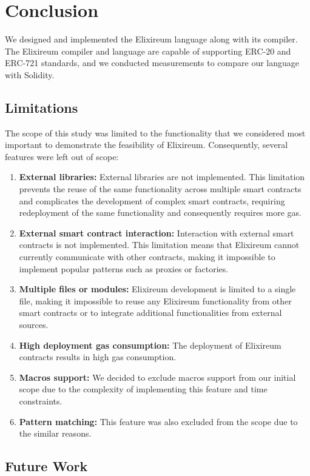 \chapter{Conclusion}
\label{chap:concl}

We designed and implemented the Elixireum language along with its compiler. The Elixireum compiler and language are capable of supporting ERC-20 and ERC-721 standards, and we conducted measurements to compare our language with Solidity.

\section{Limitations}

The scope of this study was limited to the functionality that we considered most important to demonstrate the feasibility of Elixireum. Consequently, several features were left out of scope:

\begin{enumerate}
\item \textbf{External libraries:} External libraries are not implemented. This limitation prevents the reuse of the same functionality across multiple smart contracts and complicates the development of complex smart contracts, requiring redeployment of the same functionality and consequently requires more gas.
\item \textbf{External smart contract interaction:} Interaction with external smart contracts is not implemented. This limitation means that Elixireum cannot currently communicate with other contracts, making it impossible to implement popular patterns such as proxies or factories.
\item \textbf{Multiple files or modules:} Elixireum development is limited to a single file, making it impossible to reuse any Elixireum functionality from other smart contracts or to integrate additional functionalities from external sources.
\item \textbf{High deployment gas consumption:} The deployment of Elixireum contracts results in high gas consumption.
\item \textbf{Macros support:} We decided to exclude macros support from our initial scope due to the complexity of implementing this feature and time constraints.
\item \textbf{Pattern matching:} This feature was also excluded from the scope due to the similar reasons.
\end{enumerate}

\section{Future Work}


